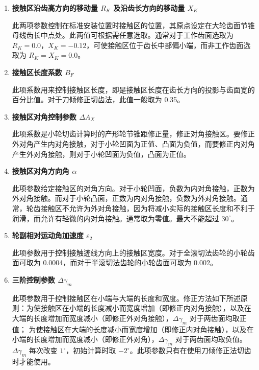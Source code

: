 ﻿\documentclass{article}
\begin{document}
\begin{enumerate}
    \item \textbf{接触区沿齿高方向的移动量 $R_K$ 及沿齿长方向的移动量 $X_K$}
    
    此两项参数控制在标准安装位置时接触区的位置，其原点设定在大轮齿面节锥母线齿长中点处。此两值可根据需任意选取。通常对于工作齿面选取为 $R_K=0.0$，$X_K=-0.12$，可使接触区位于齿长中部偏小端，而非工作齿面选取为 $R_K=X_K=0.0$。

    \item \textbf{接触区长度系数 $B_F$}
    
    此项系数用来控制接触区长度，即是接触区长度在齿长方向的投影与齿面宽的百分比值。对于刀倾修正切齿法，此值一般取为 0.35。

    \item \textbf{接触区对角控制参数 $\Delta A_X$}
    
    此项系数是小轮切齿计算时的产形轮节锥距修正量，修正对角接触区。要修正外对角产生内对角接触，对于小轮凹面为正值、凸面为负值，而要修正内对角产生外对角接触，则对于小轮凹面为负值，凸面为正值。

    \item \textbf{接触区对角方向角 $\alpha$}
    
    此项参数给定接触区的对角方向。对于小轮凹面，负数为内对角接触，正数为外对角接触。而对于小轮凸面，正数为内对角接触，负数为外对角接触。通常，轮齿接触区不允许为外对角接触，因为将减小实际的接触区长度和不利于润滑，而允许有轻微的内对角接触。通常取为零值。最大不能超过 $30^\circ$。

    \item \textbf{轮副相对运动角加速度 $\varepsilon_2$}
    
    此项参数用于控制接触迹线方向上的接触区宽度。对于全滚切法齿轮的小轮齿面可取为 0.0004，而对于半滚切法齿轮的小轮齿面可取为 0.002。

    \item \textbf{三阶控制参数 $\Delta\gamma_m$}
    
    此项参数用于控制接触区在小端与大端的长度和宽度。修正方法如下所述原则：为使接触区在小端的长度减小而宽度增加（即修正内对角接触），以及在大端的长度增加而宽度减小（即修正外对角接触），$\Delta\gamma_m$ 对于两齿面均取正值； 为使接触区在大端的长度减小而宽度增加（即修正内对角接触），以及在小端的长度增加而宽度减小（即修正外对角），$\Delta\gamma_m$ 对于两齿面均取负值。$\Delta\gamma_m$ 每次改变 $1^\circ$，初始计算时取 $-2^\circ$。此项参数只有在使用刀倾修正法切齿时才能使用。
\end{enumerate}
\end{document}
